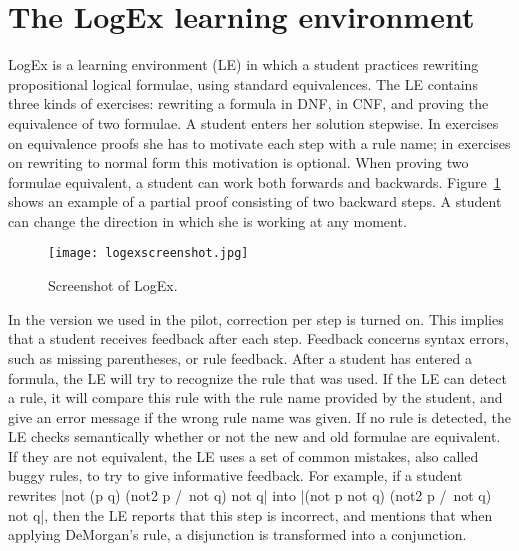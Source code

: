 \documentclass[a4paper,UKenglish]{lipics}
\begin{document}
\section{The LogEx learning environment}
\label{sec:LogEx}

LogEx is a learning environment (LE) in which a student practices rewriting
propositional logical formulae, using standard equivalences. The LE contains
three kinds of exercises: rewriting a formula in DNF, in CNF, and proving the
equivalence of two formulae. A student enters her solution stepwise. In
exercises on equivalence proofs she has to motivate each step with a rule name;
in exercises on rewriting to normal form this motivation is optional. When
proving two formulae equivalent, a student can work both forwards and backwards.
Figure~\ref{screenshot} shows an example of a partial proof consisting of two
backward steps. A student can change the direction in which she is working at
any moment.

\begin{figure}
\center\texttt{[image: logexscreenshot.jpg]}
\caption{Screenshot of LogEx.}
\label{screenshot}
\end{figure}

In the version we used in the pilot, correction per step is turned on. This implies
that a student receives feedback after each step. Feedback concerns syntax
errors, such as missing parentheses, or rule feedback. After a student has
entered a formula, the LE will try to recognize the rule that was used. If the LE can
detect a rule, it will compare this rule with the rule name provided by the
student, and give an error message if the wrong rule name was given. If no rule
is detected, the LE checks semantically whether or not the new and old formulae
are equivalent. If they are not equivalent, the LE uses a set of common
mistakes, also called buggy rules, to try to give informative feedback. For
example, if a student rewrites |not (p \/ q) \/ (not2 p /\ not q) \/ not q|
into |(not p \/ not q) \/ (not2 p /\ not q) \/ not q|, then the LE reports that
this step is incorrect, and mentions that when applying DeMorgan's rule, a
disjunction is transformed into a conjunction.
\end{document}
